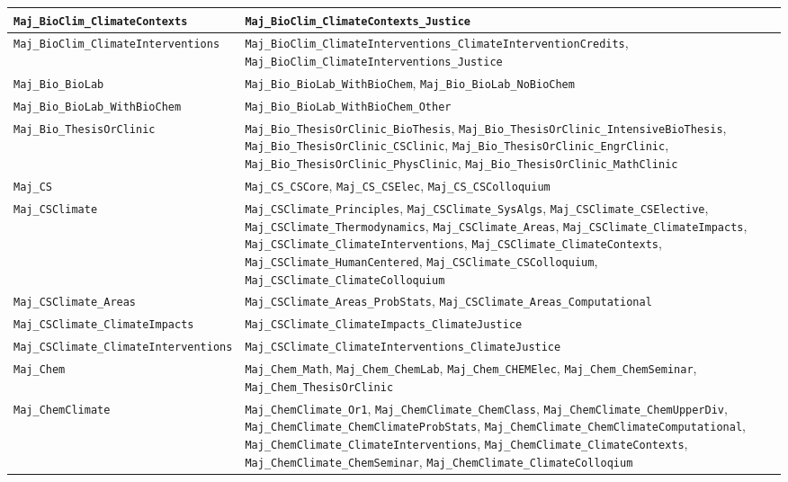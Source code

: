 \begin{longtable}{|p{4.4in}|p{4.4in}|}
    \verb|Maj_BioClim_ClimateContexts| & \verb|Maj_BioClim_ClimateContexts_Justice|\\\hline
    \verb|Maj_BioClim_ClimateInterventions| & \verb|Maj_BioClim_ClimateInterventions_ClimateInterventionCredits|, \verb|Maj_BioClim_ClimateInterventions_Justice|\\\hline
    \verb|Maj_Bio_BioLab| & \verb|Maj_Bio_BioLab_WithBioChem|, \verb|Maj_Bio_BioLab_NoBioChem|\\\hline
    \verb|Maj_Bio_BioLab_WithBioChem| & \verb|Maj_Bio_BioLab_WithBioChem_Other|\\\hline
    \verb|Maj_Bio_ThesisOrClinic| & \verb|Maj_Bio_ThesisOrClinic_BioThesis|, \verb|Maj_Bio_ThesisOrClinic_IntensiveBioThesis|, \verb|Maj_Bio_ThesisOrClinic_CSClinic|, \verb|Maj_Bio_ThesisOrClinic_EngrClinic|, \verb|Maj_Bio_ThesisOrClinic_PhysClinic|, \verb|Maj_Bio_ThesisOrClinic_MathClinic|\\\hline
    \verb|Maj_CS| & \verb|Maj_CS_CSCore|, \verb|Maj_CS_CSElec|, \verb|Maj_CS_CSColloquium|\\\hline
    \verb|Maj_CSClimate| & \verb|Maj_CSClimate_Principles|, \verb|Maj_CSClimate_SysAlgs|, \verb|Maj_CSClimate_CSElective|, \verb|Maj_CSClimate_Thermodynamics|, \verb|Maj_CSClimate_Areas|, \verb|Maj_CSClimate_ClimateImpacts|, \verb|Maj_CSClimate_ClimateInterventions|, \verb|Maj_CSClimate_ClimateContexts|, \verb|Maj_CSClimate_HumanCentered|, \verb|Maj_CSClimate_CSColloquium|, \verb|Maj_CSClimate_ClimateColloquium|\\\hline
    \verb|Maj_CSClimate_Areas| & \verb|Maj_CSClimate_Areas_ProbStats|, \verb|Maj_CSClimate_Areas_Computational|\\\hline
    \verb|Maj_CSClimate_ClimateImpacts| & \verb|Maj_CSClimate_ClimateImpacts_ClimateJustice|\\\hline
    \verb|Maj_CSClimate_ClimateInterventions| & \verb|Maj_CSClimate_ClimateInterventions_ClimateJustice|\\\hline
    \verb|Maj_Chem| & \verb|Maj_Chem_Math|, \verb|Maj_Chem_ChemLab|, \verb|Maj_Chem_CHEMElec|, \verb|Maj_Chem_ChemSeminar|, \verb|Maj_Chem_ThesisOrClinic|\\\hline
    \verb|Maj_ChemClimate| & \verb|Maj_ChemClimate_Or1|, \verb|Maj_ChemClimate_ChemClass|, \verb|Maj_ChemClimate_ChemUpperDiv|, \verb|Maj_ChemClimate_ChemClimateProbStats|, \verb|Maj_ChemClimate_ChemClimateComputational|, \verb|Maj_ChemClimate_ClimateInterventions|, \verb|Maj_ChemClimate_ClimateContexts|, \verb|Maj_ChemClimate_ChemSeminar|, \verb|Maj_ChemClimate_ClimateColloqium|\\\hline

\end{longtable}

